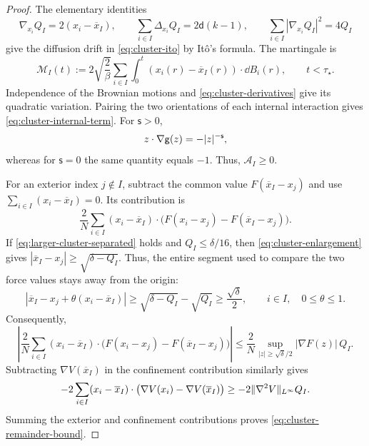 \documentclass[11pt,reqno]{amsart}
\numberwithin{equation}{section}
\theoremstyle{plain}
\theoremstyle{remark}
\DeclarePairedDelimiter{\norm}{\lVert}{\rVert}
\renewcommand{\d}{\mathsf{d}}\newcommand{\s}{\mathsf{s}}
\begin{document}
\begin{proof}
The elementary identities
\begin{equation}\label{eq:cluster-derivatives}
 \nabla_{x_i}Q_I=2(x_i-\overline x_I),
 \qquad
 \sum_{i\in I}\Delta_{x_i}Q_I=2\d(k-1),
 \qquad
 \sum_{i\in I}|\nabla_{x_i}Q_I|^2=4Q_I
\end{equation}
give the diffusion drift in \eqref{eq:cluster-ito} by It\^o's formula. The martingale is
\begin{equation}\label{eq:cluster-martingale}
 \mathcal M_I(t):=2\sqrt{\frac2\beta}
 \sum_{i\in I}\int_0^t(x_i(r)-\overline x_I(r))\cdot\dd B_i(r),
 \qquad t<\tau_\star.
\end{equation}
Independence of the Brownian motions and \eqref{eq:cluster-derivatives} give its quadratic variation. Pairing the two orientations of each internal interaction gives \eqref{eq:cluster-internal-term}. For $\s>0$,
\begin{equation}\label{eq:riesz-radial-sign}
 z\cdot\nabla\g(z)=-|z|^{-\s},
\end{equation}
whereas for $\s=0$ the same quantity equals $-1$. Thus, $\mathcal A_I\ge0$.

For an exterior index $j\notin I$, subtract the common value $F(\overline x_I-x_j)$ and use $\sum_{i\in I}(x_i-\overline x_I)=0$. Its contribution is
\begin{equation}\label{eq:cluster-exterior-contribution}
 \frac2N\sum_{i\in I}(x_i-\overline x_I)\cdot
 \bigl(F(x_i-x_j)-F(\overline x_I-x_j)\bigr).
\end{equation}
If \eqref{eq:larger-cluster-separated} holds and $Q_I\le\delta/16$, then \eqref{eq:cluster-enlargement} gives
$|\overline x_I-x_j|\ge\sqrt{\delta-Q_I}$. Thus, the entire segment used to compare the two force values stays away from the origin:
\begin{equation}\label{eq:cluster-segment-separation}
 |\overline x_I-x_j+\theta(x_i-\overline x_I)|
 \ge\sqrt{\delta-Q_I}-\sqrt{Q_I}\ge\frac{\sqrt\delta}{2},
 \qquad i\in I,\quad 0\le\theta\le1.
\end{equation}
Consequently,
\begin{equation}\label{eq:cluster-exterior-bound}
 \left|\frac2N\sum_{i\in I}(x_i-\overline x_I)\cdot
 \bigl(F(x_i-x_j)-F(\overline x_I-x_j)\bigr)\right|
 \le\frac2N\sup_{|z|\ge\sqrt\delta/2}|\nabla F(z)|\,Q_I.
\end{equation} Subtracting $\nabla V(\overline x_I)$ in the confinement contribution similarly gives
\begin{equation}\label{eq:cluster-confinement-contribution}
 -2\sum_{i\in I}(x_i-\overline x_I)\cdot
 \bigl(\nabla V(x_i)-\nabla V(\overline x_I)\bigr)
 \ge-2\norm{\nabla^2V}_{L^\infty}Q_I.
\end{equation}
Summing the exterior and confinement contributions proves \eqref{eq:cluster-remainder-bound}.
\end{proof}
\end{document}
